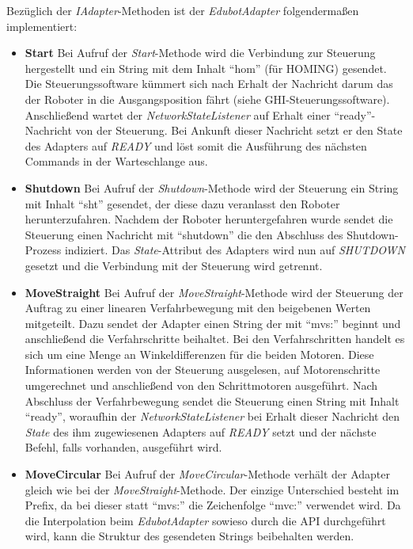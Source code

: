 Bezüglich der \textit{IAdapter}-Methoden ist der \textit{EdubotAdapter} folgendermaßen implementiert:
\begin{itemize}
\item \textbf{Start}
\newline
Bei Aufruf der \textit{Start}-Methode wird die Verbindung zur Steuerung hergestellt und ein String mit dem Inhalt “hom” (für HOMING) gesendet. Die Steuerungssoftware kümmert sich nach Erhalt der Nachricht darum das der Roboter in die Ausgangsposition fährt (siehe GHI-Steuerungssoftware). Anschließend wartet der \textit{NetworkStateListener} auf Erhalt einer “ready”-Nachricht von der Steuerung. Bei Ankunft dieser Nachricht setzt er den State des Adapters auf \textit{READY} und löst somit die Ausführung des nächsten Commands in der Warteschlange aus.
\item \textbf{Shutdown}
\newline
Bei Aufruf der \textit{Shutdown}-Methode wird der Steuerung ein String mit Inhalt “sht” gesendet, der diese dazu veranlasst den Roboter herunterzufahren. Nachdem der Roboter heruntergefahren wurde sendet die Steuerung einen Nachricht mit “shutdown” die den Abschluss des Shutdown-Prozess indiziert. Das \textit{State}-Attribut des Adapters wird nun auf \textit{SHUTDOWN} gesetzt und die Verbindung mit der Steuerung wird getrennt.
\item \textbf{MoveStraight}
\newline
Bei Aufruf der \textit{MoveStraight}-Methode wird der Steuerung der Auftrag zu einer linearen Verfahrbewegung mit den beigebenen Werten mitgeteilt. Dazu sendet der Adapter einen String der mit “mvs:” beginnt und anschließend die Verfahrschritte beihaltet. Bei den Verfahrschritten handelt es sich um eine Menge an Winkeldifferenzen für die beiden Motoren. Diese Informationen werden von der Steuerung ausgelesen, auf Motorenschritte umgerechnet und anschließend von den Schrittmotoren ausgeführt. Nach Abschluss der Verfahrbewegung sendet die Steuerung einen String mit Inhalt “ready”, woraufhin der \textit{NetworkStateListener} bei Erhalt dieser Nachricht den \textit{State} des ihm zugewiesenen Adapters auf \textit{READY} setzt und der nächste Befehl, falls vorhanden, ausgeführt wird.
\item \textbf{MoveCircular}
\newline
Bei Aufruf der \textit{MoveCircular}-Methode verhält der Adapter gleich wie bei der \textit{MoveStraight}-Methode. Der einzige Unterschied besteht im Prefix, da bei dieser statt “mvs:” die Zeichenfolge “mvc:” verwendet wird. Da die Interpolation beim \textit{EdubotAdapter} sowieso durch die API durchgeführt wird, kann die Struktur des gesendeten Strings beibehalten werden.

\end{itemize}
